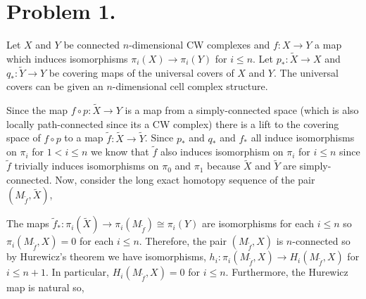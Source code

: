 \documentclass[12pt]{extarticle}
\begin{document}
 
\section*{Problem 1.}

Let $X$ and $Y$ be connected $n$-dimensional CW complexes and $f : X \to Y$ a map which induces isomorphisms $\pi_i(X) \to \pi_i(Y)$ for $i \le n$. Let $p_* : \tilde{X} \to X$ and $q_* : \tilde{Y} \to Y$ be covering maps of the universal covers of $X$ and $Y$. The universal covers can be given an $n$-dimensional cell complex structure.
\begin{center}
\end{center} 
Since the map $f \circ p : \tilde{X} \to Y$ is a map from a simply-connected space (which is also locally path-connected since its a CW complex) there is a lift to the covering space of $f \circ p$ to a map $\tilde{f} : \tilde{X} \to \tilde{Y}$. Since $p_*$ and $q_*$ and $f_*$ all induce isomorphisms on $\pi_i$ for $1 < i \le n$ we know that $\tilde{f}$ also induces isomorphism on $\pi_i$ for $i \le n$ since $\tilde{f}$ trivially induces isomorphisms on $\pi_0$ and $\pi_1$ because $\tilde{X}$ and $\tilde{Y}$ are simply-connected. Now, consider the long exact homotopy sequence of the pair $(M_{\tilde{f}}, \tilde{X})$,
\begin{center}
\end{center}
The maps $\tilde{f}_* : \pi_i(\tilde{X}) \to \pi_i(M_{\tilde{f}}) \cong \pi_i(Y)$ are isomorphisms for each $i \le n$ so $\pi_i(M_{\tilde{f}}, X) = 0$ for each $i \le n$. Therefore, the pair $(M_{\tilde{f}}, X)$ is $n$-connected so by Hurewicz's theorem we have isomorphisms, $h_i : \pi_i(M_{\tilde{f}}, X) \to H_i(M_{\tilde{f}}, X)$ for $i \le n+1$. In particular, $H_i(M_{\tilde{f}}, X) = 0$ for $i \le n$. Furthermore, the Hurewicz map is natural so,
\begin{center}
\end{center}
\end{document}
